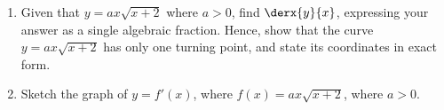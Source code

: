 \begin{solution}
\begin{ppart}
\begin{center}
        \end{center}
    \end{ppart}
\end{solution}

\begin{problem}
    \begin{enumerate}
        \item Given that $y=ax\sqrt{x+2}$ where $a > 0$, find $\derx{y}{x}$, expressing your answer as a single algebraic fraction. Hence, show that the curve $y = ax\sqrt{x+2}$ has only one turning point, and state its coordinates in exact form.
        \item Sketch the graph of $y = f'(x)$, where $f(x) = ax\sqrt{x+2}$, where $a > 0$.
    \end{enumerate}
\end{problem}
